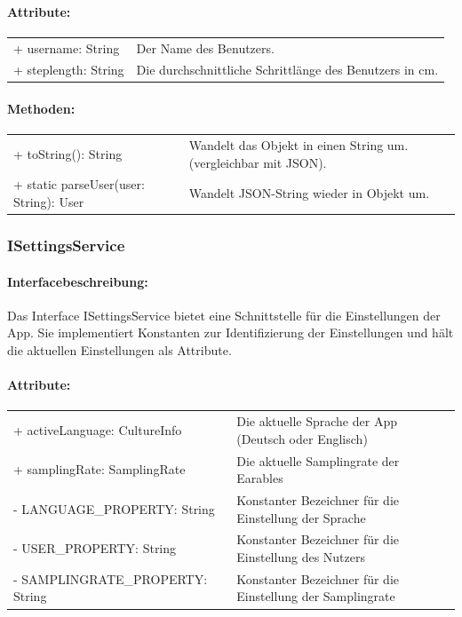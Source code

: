 \documentclass[a4paper,12pt]{article}
\begin{document}
    \paragraph{Attribute:}
    \begin{tabular}{p{5cm}p{12cm}}
        + username: String & Der Name des Benutzers.\\
        + steplength: String & Die durchschnittliche Schrittlänge des Benutzers in cm.\\
    \end{tabular}
    \paragraph{Methoden:}
    \begin{tabular}{p{7cm}p{10cm}}
        + toString(): String & Wandelt das Objekt in einen String um. (vergleichbar mit JSON).\\
        + static parseUser(user: String): User & Wandelt JSON-String wieder in Objekt um.\\
    \end{tabular}
\subsubsection{ISettingsService}
	\paragraph{Interfacebeschreibung:}
	Das Interface ISettingsService bietet eine Schnittstelle für die Einstellungen der App. Sie implementiert Konstanten zur Identifizierung der Einstellungen und hält die aktuellen Einstellungen als Attribute.
	\paragraph{Attribute:}
	\begin{tabular}{p{7cm}p{10cm}}
		+ activeLanguage: CultureInfo & Die aktuelle Sprache der App (Deutsch oder Englisch)\\
		+ samplingRate: SamplingRate & Die aktuelle Samplingrate der \Gls{Earables} \\ 
		- LANGUAGE\_PROPERTY: String & Konstanter Bezeichner für die Einstellung der Sprache \\
		- USER\_PROPERTY: String & Konstanter Bezeichner für die Einstellung des Nutzers \\
		- SAMPLINGRATE\_PROPERTY: String & Konstanter Bezeichner für die Einstellung der Samplingrate \\
	\end{tabular}
\end{document}
